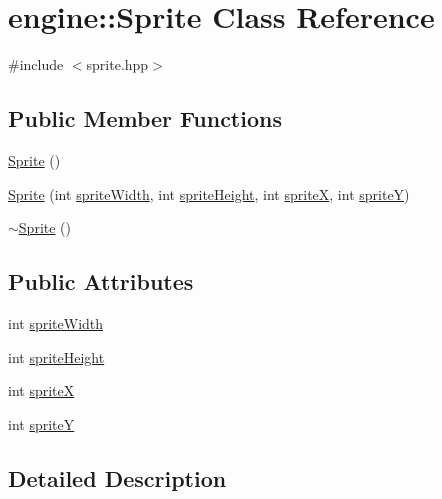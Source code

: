 \hypertarget{classengine_1_1_sprite}{}\section{engine\+:\+:Sprite Class Reference}
\label{classengine_1_1_sprite}


{\ttfamily \#include $<$sprite.\+hpp$>$}

\subsection*{Public Member Functions}
\begin{DoxyCompactItemize}
\item 
\hyperlink{classengine_1_1_sprite_a12cba3ac1868418add3c4d95ce87e615}{Sprite} ()
\item 
\hyperlink{classengine_1_1_sprite_ab88d7f28df5bd653a9ed1206b14429e9}{Sprite} (int \hyperlink{classengine_1_1_sprite_a6bf325695b8242a3e3a5844a13ca4405}{sprite\+Width}, int \hyperlink{classengine_1_1_sprite_a535447d266fb4582b772f5277ae02f3a}{sprite\+Height}, int \hyperlink{classengine_1_1_sprite_ad3676fe88266289405966233c7990d33}{spriteX}, int \hyperlink{classengine_1_1_sprite_a5726d051f7f84fbffb8a74792a3f02a1}{spriteY})
\item 
\hyperlink{classengine_1_1_sprite_a8accab430f9d90ae5117b57d67e32b84}{$\sim$\+Sprite} ()
\end{DoxyCompactItemize}
\subsection*{Public Attributes}
\begin{DoxyCompactItemize}
\item 
int \hyperlink{classengine_1_1_sprite_a6bf325695b8242a3e3a5844a13ca4405}{sprite\+Width}
\item 
int \hyperlink{classengine_1_1_sprite_a535447d266fb4582b772f5277ae02f3a}{sprite\+Height}
\item 
int \hyperlink{classengine_1_1_sprite_ad3676fe88266289405966233c7990d33}{spriteX}
\item 
int \hyperlink{classengine_1_1_sprite_a5726d051f7f84fbffb8a74792a3f02a1}{spriteY}
\end{DoxyCompactItemize}


\subsection{Detailed Description}


